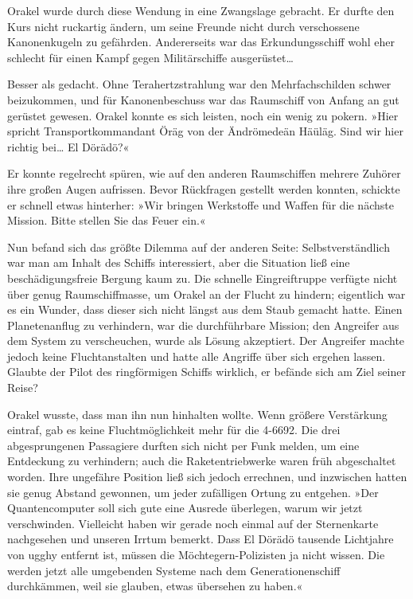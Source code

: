 Orakel wurde durch diese Wendung in eine Zwangslage gebracht. Er durfte den Kurs nicht ruckartig ändern, um seine Freunde nicht durch verschossene Kanonenkugeln zu gefährden. Andererseits war das Erkundungsschiff wohl eher schlecht für einen Kampf gegen Militärschiffe ausgerüstet…


Besser als gedacht. Ohne Terahertzstrahlung war den Mehrfachschilden schwer beizukommen, und für Kanonenbeschuss war das Raumschiff von Anfang an gut gerüstet gewesen. Orakel konnte es sich leisten, noch ein wenig zu pokern. »Hier spricht Transportkommandant Öräg von der Ändrömedeän Häüläg. Sind wir hier richtig bei… El Dörädö?«

Er konnte regelrecht spüren, wie auf den anderen Raumschiffen mehrere Zuhörer ihre großen Augen aufrissen. Bevor Rückfragen gestellt werden konnten, schickte er schnell etwas hinterher: »Wir bringen Werkstoffe und Waffen für die nächste Mission. Bitte stellen Sie das Feuer ein.«

Nun befand sich das größte Dilemma auf der anderen Seite: Selbstverständlich war man am Inhalt des Schiffs interessiert, aber die Situation ließ eine beschädigungsfreie Bergung kaum zu. Die schnelle Eingreiftruppe verfügte nicht über genug Raumschiffmasse, um Orakel an der Flucht zu hindern; eigentlich war es ein Wunder, dass dieser sich nicht längst aus dem Staub gemacht hatte. Einen Planetenanflug zu verhindern, war die durchführbare Mission; den Angreifer aus dem System zu verscheuchen, wurde als Lösung akzeptiert. Der Angreifer machte jedoch keine Fluchtanstalten und hatte alle Angriffe über sich ergehen lassen. Glaubte der Pilot des ringförmigen Schiffs wirklich, er befände sich am Ziel seiner Reise?

Orakel wusste, dass man ihn nun hinhalten wollte. Wenn größere Verstärkung eintraf, gab es keine Fluchtmöglichkeit mehr für die 4-6692. Die drei abgesprungenen Passagiere durften sich nicht per Funk melden, um eine Entdeckung zu verhindern; auch die Raketentriebwerke waren früh abgeschaltet worden. Ihre ungefähre Position ließ sich jedoch errechnen, und inzwischen hatten sie genug Abstand gewonnen, um jeder zufälligen Ortung zu entgehen. »Der Quantencomputer soll sich gute eine Ausrede überlegen, warum wir jetzt verschwinden. Vielleicht haben wir gerade noch einmal auf der Sternenkarte nachgesehen und unseren Irrtum bemerkt. Dass El Dörädö tausende Lichtjahre von ugghy entfernt ist, müssen die Möchtegern-Polizisten ja nicht wissen. Die werden jetzt alle umgebenden Systeme nach dem Generationenschiff durchkämmen, weil sie glauben, etwas übersehen zu haben.«

